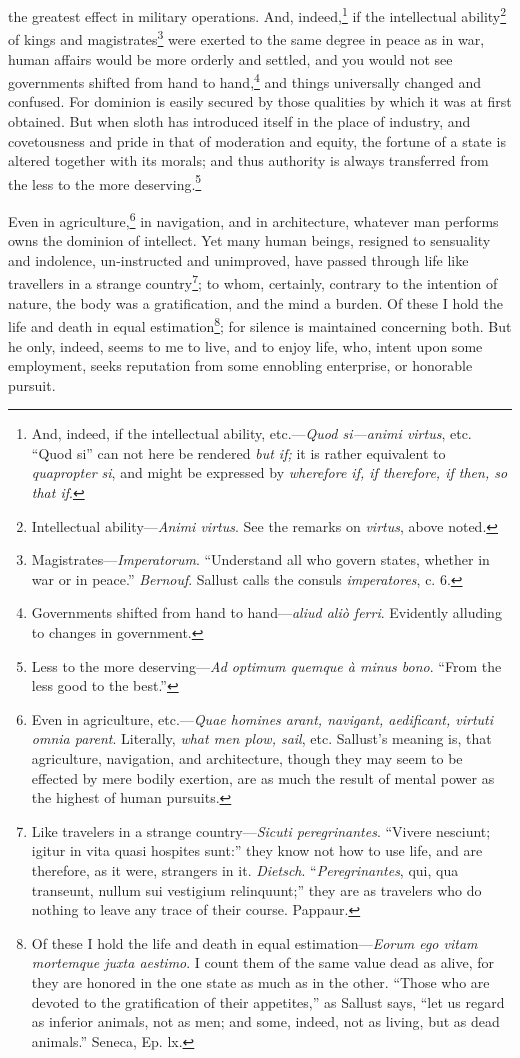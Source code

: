 the greatest effect in military operations. And, indeed,\footnote{And, indeed, if the intellectual ability, etc.—\emph{Quod
si—animi virtus}, etc. ``Quod si'' can not here be rendered \emph{but if;}
it is rather equivalent to \emph{quapropter si}, and might be expressed by
\emph{wherefore if, if therefore, if then, so that if}.} if the
intellectual ability\footnote{Intellectual ability—\emph{Animi virtus}. See the remarks on
\emph{virtus}, above noted.} of kings and magistrates\footnote{Magistrates—\emph{Imperatorum}. ``Understand all who govern
states, whether in war or in peace.'' \emph{Bernouf}. Sallust calls the
consuls \emph{imperatores}, c. 6.} were exerted to
the same degree in peace as in war, human affairs would be more
orderly and settled, and you would not see governments shifted from
hand to hand,\footnote{Governments shifted from hand to hand—\emph{aliud aliò ferri}.
Evidently alluding to changes in government.} and things universally changed and confused. For
dominion is easily secured by those qualities by which it was at first
obtained. But when sloth has introduced itself in the place of industry,
and covetousness and pride in that of moderation and equity, the fortune
of a state is altered together with its morals; and thus authority is
always transferred from the less to the more deserving.\footnote{Less to the more deserving—\emph{Ad optimum quemque à minus
bono}. ``From the less good to the best.''}

Even in agriculture,\footnote{Even in agriculture, etc.—\emph{Quae homines arant, navigant,
aedificant, virtuti omnia parent}. Literally, \emph{what men plow, sail},
etc. Sallust's meaning is, that agriculture, navigation, and
architecture, though they may seem to be effected by mere bodily
exertion, are as much the result of mental power as the highest of
human pursuits.} in navigation, and in architecture, whatever
man performs owns the dominion of intellect. Yet many human beings,
resigned to sensuality and indolence, un-instructed and unimproved,
have passed through life like travellers in a strange country\footnote{Like travelers in a strange country—\emph{Sicuti peregrinantes}.
``Vivere nesciunt; igitur in vita quasi hospites sunt:'' they know not
how to use life, and are therefore, as it were, strangers in it.
\emph{Dietsch}. ``\emph{Peregrinantes}, qui, qua transeunt, nullum sui vestigium
relinquunt;'' they are as travelers who do nothing to leave any trace
of their course. Pappaur.}; to
whom, certainly, contrary to the intention of nature, the body was a
gratification, and the mind a burden. Of these I hold the life and
death in equal estimation\footnote{Of these I hold the life and death in equal estimation—\emph{Eorum
ego vitam mortemque juxta aestimo}. I count them of the same value dead
as alive, for they are honored in the one state as much as in the other.
``Those who are devoted to the gratification of their appetites,'' as
Sallust says, ``let us regard as inferior animals, not as men; and some,
indeed, not as living, but as dead animals.'' Seneca, Ep. lx.}; for silence is maintained concerning
both. But he only, indeed, seems to me to live, and to enjoy life,
who, intent upon some employment, seeks reputation from some ennobling
enterprise, or honorable pursuit.

